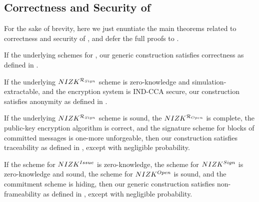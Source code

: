 \subsection{Correctness and Security of \GSACGen}
\label{ssec:security-gsac}

For the sake of brevity, here we just enuntiate the main theorems related to
correctness and security of \GSAC, and defer the full proofs to
.

\begin{theorem}
  \label{thm:correctness-gsac}
  If the underlying schemes for , our generic construction \GSACGen
  satisfies correctness as defined in .
\end{theorem}

\begin{theorem}
  \label{thm:anonymity-gsac}
  If the underlying $NIZK^{\mathcal{R}_{Sign}}$ scheme is zero-knowledge and
  simulation-extractable, and the encryption system is IND-CCA secure,
  our \GSACGen construction satisfies anonymity as defined in
  .
\end{theorem}

\begin{theorem}
  \label{thm:trace-gsac}
  If the underlying $NIZK^{\mathcal{R}_{Sign}}$ scheme is sound, the
  $NIZK^{\mathcal{R}_{Open}}$ is  complete, the public-key encryption algorithm
  is correct, and the signature scheme for blocks of committed messages is
  one-more unforgeable, then our \GSACGen construction satisfies traceability as
  defined in , except with negligible
  probability.
\end{theorem}

\begin{theorem}
  \label{thm:frame-gsac}
  If the scheme for $NIZK^{Issue}$ is zero-knowledge, the scheme for
  $NIZK^{Sign}$ is zero-knowledge and sound, the scheme for $NIZK^{Open}$ is
  sound, and the commitment scheme \C is hiding, then our generic \GSACGen
  construction satisfies non-frameability as defined in ,
  except with negligible probability.
\end{theorem}

